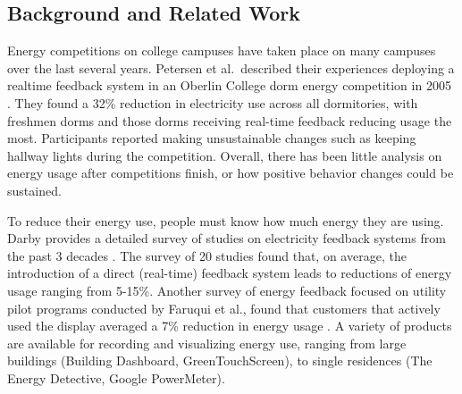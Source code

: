 \documentclass{chi-ext}
\begin{document}
\begin{multicols}{2}
\section{Background and Related Work}

%

Energy competitions on college campuses have taken place on many campuses over the last several years. Petersen et al.\ described their experiences deploying a realtime feedback system in an Oberlin College dorm energy competition in 2005 \cite{petersen-dorm-energy-reduction}. They found a 32\% reduction in electricity use across all dormitories, with freshmen dorms and those dorms receiving real-time feedback reducing usage the most. Participants reported making unsustainable changes such as keeping hallway lights during the competition. Overall, there has been little analysis on energy usage after competitions finish, or how positive behavior changes could be sustained.

To reduce their energy use, people must know how much energy they are using. Darby provides a detailed survey of studies on electricity feedback systems from the past 3 decades \cite{darby-review-2006}. The survey of 20 studies found that, on average, the introduction of a direct (real-time) feedback system leads to reductions of energy usage ranging from 5-15\%. Another survey of energy feedback focused on utility pilot programs conducted by Faruqui et al., found that customers that actively used the display averaged a 7\% reduction in energy usage \cite{Faruqui09}. A variety of products are available for recording and visualizing energy use, ranging from large buildings (Building Dashboard, GreenTouchScreen), to single residences (The Energy Detective, Google PowerMeter).


\end{multicols}
\end{document}
